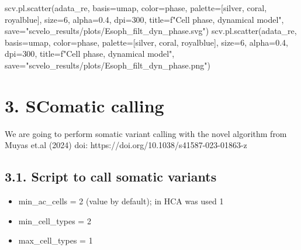 \documentclass[
  letterpaper,
  DIV=11,
  numbers=noendperiod]{scrreprt}
\newenvironment{Shaded}{\begin{snugshade}}{\end{snugshade}}
\newcommand{\DecValTok}[1]{\textcolor[rgb]{0.68,0.00,0.00}{#1}}
\newcommand{\FloatTok}[1]{\textcolor[rgb]{0.68,0.00,0.00}{#1}}
\newcommand{\NormalTok}[1]{\textcolor[rgb]{0.00,0.23,0.31}{#1}}
\newcommand{\OperatorTok}[1]{\textcolor[rgb]{0.37,0.37,0.37}{#1}}
\newcommand{\SpecialStringTok}[1]{\textcolor[rgb]{0.13,0.47,0.30}{#1}}
\newcommand{\StringTok}[1]{\textcolor[rgb]{0.13,0.47,0.30}{#1}}
\providecommand{\tightlist}{%
  \setlength{\itemsep}{0pt}\setlength{\parskip}{0pt}}\usepackage{longtable,booktabs,array}
\begin{document}
\begin{Shaded}
\begin{Highlighting}[]
\NormalTok{scv.pl.scatter(adata\_re, basis}\OperatorTok{=}\StringTok{\textquotesingle{}umap\textquotesingle{}}\NormalTok{, color}\OperatorTok{=}\StringTok{\textquotesingle{}phase\textquotesingle{}}\NormalTok{, palette}\OperatorTok{=}\NormalTok{[}\StringTok{\textquotesingle{}silver\textquotesingle{}}\NormalTok{, }\StringTok{\textquotesingle{}coral\textquotesingle{}}\NormalTok{, }\StringTok{\textquotesingle{}royalblue\textquotesingle{}}\NormalTok{], size}\OperatorTok{=}\DecValTok{6}\NormalTok{, alpha}\OperatorTok{=}\FloatTok{0.4}\NormalTok{, dpi}\OperatorTok{=}\DecValTok{300}\NormalTok{, title}\OperatorTok{=}\SpecialStringTok{f"Cell phase, dynamical model"}\NormalTok{, save}\OperatorTok{=}\StringTok{"scvelo\_results/plots/Esoph\_filt\_dyn\_phase.svg"}\NormalTok{)}
\NormalTok{scv.pl.scatter(adata\_re, basis}\OperatorTok{=}\StringTok{\textquotesingle{}umap\textquotesingle{}}\NormalTok{, color}\OperatorTok{=}\StringTok{\textquotesingle{}phase\textquotesingle{}}\NormalTok{, palette}\OperatorTok{=}\NormalTok{[}\StringTok{\textquotesingle{}silver\textquotesingle{}}\NormalTok{, }\StringTok{\textquotesingle{}coral\textquotesingle{}}\NormalTok{, }\StringTok{\textquotesingle{}royalblue\textquotesingle{}}\NormalTok{], size}\OperatorTok{=}\DecValTok{6}\NormalTok{, alpha}\OperatorTok{=}\FloatTok{0.4}\NormalTok{, dpi}\OperatorTok{=}\DecValTok{300}\NormalTok{, title}\OperatorTok{=}\SpecialStringTok{f"Cell phase, dynamical model"}\NormalTok{, save}\OperatorTok{=}\StringTok{"scvelo\_results/plots/Esoph\_filt\_dyn\_phase.png"}\NormalTok{)}
\end{Highlighting}
\end{Shaded}

\chapter{3. SComatic calling}\label{scomatic-calling}

We are going to perform somatic variant calling with the novel algorithm
from Muyas et.al (2024) doi: https://doi.org/10.1038/s41587-023-01863-z

\section{3.1. Script to call somatic
variants}\label{script-to-call-somatic-variants}

\begin{itemize}
\tightlist
\item
  min\_ac\_cells = 2 (value by default); in HCA was used 1
\item
  min\_cell\_types = 2
\item
  max\_cell\_types = 1
\end{itemize}
\end{document}
